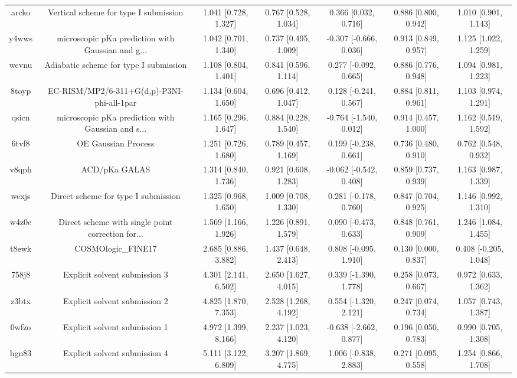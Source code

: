 \documentclass{article}
\begin{document}
\begin{center}
\begin{longtable}{|ccccccc|}
 arcko &              Vertical scheme for type I submission &  1.041 [0.728, 1.327] &  0.767 [0.528, 1.034] &     0.366 [0.032, 0.716] &  0.886 [0.800, 0.942] &   1.010 [0.901, 1.143] \\
 y4wws &  microscopic pKa prediction with Gaussian and g... &  1.042 [0.701, 1.340] &  0.737 [0.495, 1.009] &   -0.307 [-0.666, 0.036] &  0.913 [0.849, 0.957] &   1.125 [1.022, 1.259] \\
 wcvnu &             Adiabatic scheme for type I submission &  1.108 [0.804, 1.401] &  0.841 [0.596, 1.114] &    0.277 [-0.092, 0.665] &  0.886 [0.776, 0.948] &   1.094 [0.981, 1.223] \\
 8toyp &         EC-RISM/MP2/6-311+G(d,p)-P3NI-phi-all-1par &  1.134 [0.604, 1.650] &  0.696 [0.412, 1.047] &    0.128 [-0.241, 0.567] &  0.884 [0.811, 0.961] &   1.103 [0.974, 1.291] \\
 qsicn &  microscopic pKa prediction with Gaussian and s... &  1.165 [0.296, 1.647] &  0.884 [0.228, 1.540] &   -0.764 [-1.540, 0.012] &  0.914 [0.457, 1.000] &   1.162 [0.519, 1.592] \\
 6tvf8 &                                OE Gaussian Process &  1.251 [0.726, 1.680] &  0.789 [0.457, 1.169] &    0.199 [-0.238, 0.661] &  0.736 [0.480, 0.910] &   0.762 [0.548, 0.932] \\
 v8qph &                                      ACD/pKa GALAS &  1.314 [0.840, 1.736] &  0.921 [0.608, 1.283] &   -0.062 [-0.542, 0.408] &  0.859 [0.737, 0.939] &   1.163 [0.987, 1.339] \\
 wexjs &                Direct scheme for type I submission &  1.325 [0.968, 1.650] &  1.009 [0.708, 1.330] &    0.281 [-0.178, 0.760] &  0.847 [0.704, 0.925] &   1.146 [0.992, 1.310] \\
 w4z0e &  Direct scheme with single point correction for... &  1.569 [1.166, 1.926] &  1.226 [0.891, 1.579] &    0.090 [-0.473, 0.633] &  0.848 [0.761, 0.909] &   1.246 [1.084, 1.455] \\
 t8ewk &                                 COSMOlogic\_FINE17 &  2.685 [0.886, 3.882] &  1.437 [0.648, 2.413] &    0.808 [-0.095, 1.910] &  0.130 [0.000, 0.837] &  0.408 [-0.205, 1.048] \\
 758j8 &                      Explicit solvent submission 3 &  4.301 [2.141, 6.502] &  2.650 [1.627, 4.015] &    0.339 [-1.390, 1.778] &  0.258 [0.073, 0.667] &   0.972 [0.633, 1.362] \\
 z3btx &                      Explicit solvent submission 2 &  4.825 [1.870, 7.353] &  2.528 [1.268, 4.192] &    0.554 [-1.320, 2.121] &  0.247 [0.074, 0.734] &   1.057 [0.743, 1.387] \\
 0wfzo &                      Explicit solvent submission 1 &  4.972 [1.399, 8.166] &  2.237 [1.023, 4.120] &   -0.638 [-2.662, 0.877] &  0.196 [0.050, 0.783] &   0.990 [0.705, 1.308] \\
 hgn83 &                      Explicit solvent submission 4 &  5.111 [3.122, 6.809] &  3.207 [1.869, 4.775] &    1.006 [-0.838, 2.883] &  0.271 [0.095, 0.558] &   1.254 [0.866, 1.708] \\
\end{longtable}
\end{center}
\end{document}
